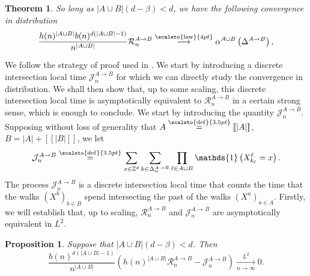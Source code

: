 \documentclass[12pt]{article}
\newcommand{\R}{\mathcal R}
\newcommand{\J}{\mathcal J}
\newcommand{\1}{\mathds{1}}
\newcommand{\ZZ}{\mathbb Z}
\newcommand{\distribution}{\stackrel{\scaleto{\mathrm{law}}{4pt}}{\longrightarrow}}
\newcommand{\eqdef}{\stackrel{\scaleto{\mathrm{def}}{3.5pt}}{=}}
\newtheorem{theorem}{Theorem}
\newtheorem{proposition}{Proposition}
\numberwithin{equation}{section}
\begin{document}
\begin{theorem}
\label{theorem:convergence of R_n^(A->B)}
    So long as $|A\cup B|(d-\beta)<d$, we have the following convergence in distribution
    \begin{equation}
        \label{convergence:limit of R_n^(A->B)}
        \frac{h(n)^{|A\cup B|}b(n)^{d(|A\cup B|-1)}}{n^{|A\cup B|}}\mathcal R_n^{A\rightarrow B}\distribution \alpha^{A\cup B}\left(\Delta^{A\rightarrow B}\right),
    \end{equation}
\end{theorem}

We follow the strategy of proof used in \cite{LeGallRosenRangeOfStableRandomWalks1991}. We start by introducing a discrete intersection local time $\mathcal J_n^{A\rightarrow B}$ for which we can directly study the convergence in distribution. We shall then show that, up to some scaling, this discrete intersection local time is asymptotically equivalent to $\mathcal R_n^{A\rightarrow B}$ in a certain strong sense, which is enough to conclude. We start by introducing the quantity $\mathcal J_n^{A\rightarrow B}$. Supposing without loss of generality that $A\eqdef[\![|A|]\!]$, $B=|A|+[\![|B|]\!]$, we let
\begin{equation*}
    \mathcal J_n^{A\rightarrow B}\eqdef\sum_{x\in\ZZ^d}\sum_{k\in \Delta_n^{A\rightarrow B}}\prod_{\ell\in A\cup B}\1\left(X_{k_\ell}^{\ell}=x\right).
\end{equation*}
The process $\mathcal J_n^{A\rightarrow B}$ is a discrete intersection local time that counts the time that the walks $(X^b)_{b\in B}$ spend intersecting the past of the walks $(X^a)_{a\in A}$. Firstly, we will establish that, up to scaling, $\R_n^{A\rightarrow B}$ and $\J_n^{A\rightarrow B}$ are asymptotically equivalent in $L^2$.

\begin{proposition}
\label{proposition: h(n)^(a+b)R_n^(A->B) and J_n^(A->B) are close in L^2}
    Suppose that $|A\cup B|(d-\beta)<d$. Then
    \begin{equation*}
        \frac{b(n)^{d(|A\cup B|-1)}}{n^{|A\cup B|}}\left(h(n)^{|A\cup B|}\mathcal R_n^{A\rightarrow B}-\mathcal J_n^{A\rightarrow B}\right)\underset{n\rightarrow\infty}{\overset{L^2}\longrightarrow}0.
    \end{equation*}
\end{proposition}
\end{document}
